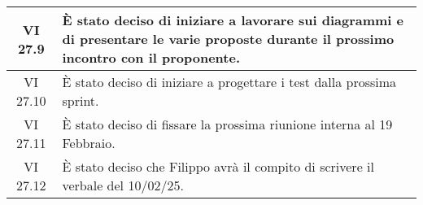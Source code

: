\begin{table}[htbp]
\begin{tabular}{|c|p{}|}
        \hline
        VI 27.9 & È stato deciso di iniziare a lavorare sui diagrammi e di presentare le varie proposte durante il prossimo incontro con il proponente. \\
        \hline
        VI 27.10 & È stato deciso di iniziare a progettare i test dalla prossima sprint. \\
        \hline
        VI 27.11 & È stato deciso di fissare la prossima riunione interna al 19 Febbraio. \\
        \hline
        VI 27.12 & È stato deciso che Filippo avrà il compito di scrivere il verbale del 10/02/25. \\
        \hline
    \end{tabular}
\end{table}
